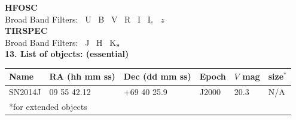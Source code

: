 \documentclass[11pt]{article}
\begin{document}
{\bf HFOSC}\\
{\bfs Broad Band Filters:} \NO~U \YES~B \YES~V \YES~R \YES~I \NO~I$_c$ 
\NO~$z$\\ [1mm]

{\bf TIRSPEC}\\
{\bfs Broad Band Filters:} \YES~J \YES~H \YES~K$_{\rm s}$ \\ [1mm]

%

{\bf 13. List of objects: (essential)}\\

\begin{tabular}{|p{1in}|p{1.5in}|p{1.5in}|p{0.5in}|p{0.5in}|p{0.5in}|}
\hline
Name & RA (hh mm ss)& Dec (dd mm ss) & Epoch & $V$ mag & size$^*$ \\
\hline
SN2014J & 09 55 42.12 & +69 40 25.9  &  J2000 & 20.3 &  N/A  \\\hline
\hline
 \multicolumn{6}{l}{*for extended objects}\\
\end{tabular}
\end{document}
